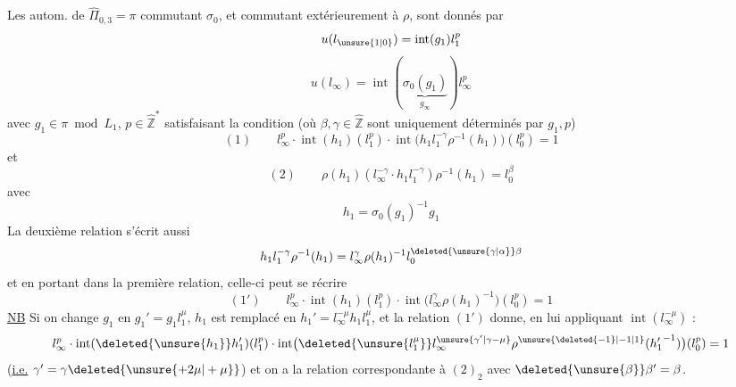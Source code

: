 Les autom.  de $\hat\Pi_{0,3}=\pi$ commutant  $\sigma_0$, et commutant extérieurement à $\rho$, sont donnés par
\[
u(l_{\unsure{1|0}})=\operatorname{int}(g_1)l_1^{p}
\]
\[
u(l_\infty)=\operatorname{int}(\underbrace{\sigma_0(g_1)}_{g_\infty})l_\infty^{p}
\]
avec $g_1\in\pi\bmod L_1$, $p\in\hat{\mathbb Z}^{*}$ satisfaisant la condition (où $\beta,\gamma\in\hat{\mathbb Z}$ sont uniquement déterminés par $g_1,p$)
\[
(1)\qquad\boxed{l_\infty^{p}\cdot\operatorname{int}(h_1)(l_1^{p})\cdot\operatorname{int}\bigl(h_1l_1^{-\gamma}\rho^{-1}(h_1)\bigr)(l_0^{p})=1}
\]
et
\[
(2)\qquad\boxed{\rho(h_1)(l_\infty^{-\gamma}\cdot h_1l_1^{-\gamma})\rho^{-1}(h_1)=l_0^\beta}
\]
avec
\[
h_1=\sigma_0(g_1)^{-1}g_1
\]
La deuxième relation s'écrit aussi
\[
h_1l_1^{-\gamma}\rho^{-1}(h_1)=l_\infty^\gamma\rho(h_1)^{-1}l_0^{\deleted{\unsure{\gamma|\alpha}}\beta}
\]
et en portant dans la première relation, celle-ci peut se récrire
\[
(1')\qquad\boxed{l_\infty^{p}\cdot\operatorname{int}(h_1)(l_1^{p})\cdot\operatorname{int}\bigl(l_\infty^\gamma\rho(h_1)^{-1}\bigr)(l_0^{p})=1}
\]
\uline{NB} Si on change $g_1$ en $g_1'=g_1l_1^\mu$, $h_1$ est remplacé en $h_1'=l_\infty^{-\mu}h_1l_1^\mu$, et la relation $(1')$ donne, en lui appliquant $\operatorname{int}(l_\infty^{-\mu})$ :
\[
l_\infty^{p}\cdot\operatorname{int}(\deleted{\unsure{h_1}}h_1')(l_1^{p})\cdot\operatorname{int}\bigl(\deleted{\unsure{l_1^\mu}}l_\infty^{\unsure{\gamma'|\gamma-\mu}}\rho^{\unsure{\deleted{-1}|-1|1}}({h_1'}^{-1})\bigr)(l_0^{p})=1
\]
(\uline{i.e.} \uline{$\gamma'=\gamma\deleted{\unsure{+2\mu|+\mu}}$}) et on a la relation correspondante à $(2)_2$ avec $\deleted{\unsure{\beta}}\beta'=\beta$.
